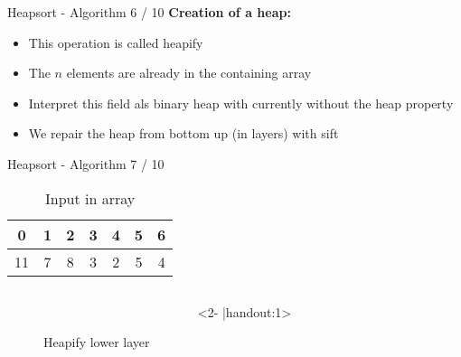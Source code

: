 
\begin{frame}{Heapsort - Algorithm 6 / 10}
  \textbf{Creation of a heap:}
  \begin{itemize}
    \item
      This operation is called {\color{MainA}heapify}
    \item<2- |handout:1>
      The {\color{MainA}$n$} elements are already in the containing array
    \item<3- |handout:1>
      Interpret this field als binary heap with currently without the
      {\color{MainA}heap property}
    \item<4- |handout:1>
      We repair the heap from bottom up (in layers) with {\color{MainA}sift}
  \end{itemize}
\end{frame}


\begin{frame}{Heapsort - Algorithm 7 / 10}
  \vspace{-1.0em}
  \begin{table}[!h]%
    \caption{Input in array}%
    \label{tab:heapify_numbers}%
    \begin{tabular}{ccccccc}
      {\color{MainB}0}&
      {\color{MainB}1}&
      {\color{MainB}2}&
      {\color{MainB}3}&
      {\color{MainB}4}&
      {\color{MainB}5}&
      {\color{MainB}6}\\
      \hline
      \multicolumn{1}{|c}{11}&%
      \multicolumn{1}{|c}{7}&%
      \multicolumn{1}{|c}{8}&%
      \multicolumn{1}{|c}{3}&%
      \multicolumn{1}{|c}{2}&%
      \multicolumn{1}{|c}{5}&%
      \multicolumn{1}{|c|}{4}\\
      \hline
    \end{tabular}
  \end{table}
  \vspace*{-0.5em}
  \begin{centering}
    \begin{figure}[!h]%
      \begin{columns}%
        \begin{column}{0.425\textwidth}%
          \begin{adjustbox}{width=\linewidth}%
          \end{adjustbox}%
        \end{column}%
        \begin{column}{0.425\textwidth}<2- |handout:1>%
          \begin{adjustbox}{width=\linewidth}%
          \end{adjustbox}%
        \end{column}%
      \end{columns}%
      \caption{Heapify lower layer}%
      \label{fig:heapify_lower}%
    \end{figure}
  \end{centering}
\end{frame}

